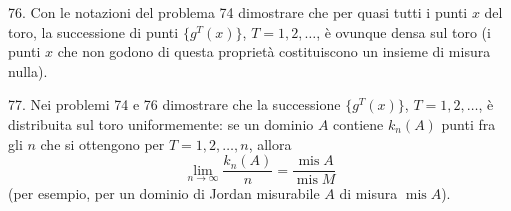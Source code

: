 \begin{problem}{76.}
	Con le notazioni del problema 74 dimostrare che per quasi tutti i punti $x$ del toro, la successione di punti  $\{g^T (x)\}$, $T=1, 2, \dotsc$, è ovunque densa sul toro
	(i punti $x$ che non godono di questa proprietà costituiscono un insieme di misura nulla).
\end{problem}

\begin{problem}{77.}
	Nei problemi 74 e 76 dimostrare che la successione  $\{g^T (x)\}$, $T=1, 2, \dotsc$, è distribuita sul toro uniformemente: se un dominio $A$ contiene $k_n(A)$ punti fra gli $n$ che si ottengono per $T=1, 2, \dotsc,n$, allora
	\begin{equation*}
		\lim_{n \to \infty} \frac{k_n(A)}{n}=\frac{\operatorname{mis} A}{\operatorname{mis} M}
	\end{equation*}
	(per esempio, per un dominio di Jordan misurabile $A$ di misura $\operatorname{mis} A$).
\end{problem}

